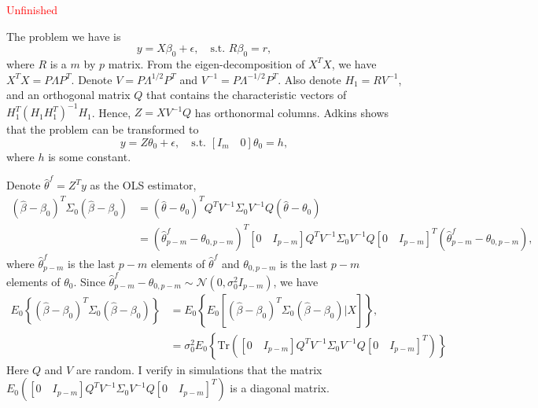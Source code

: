 \textcolor{red}{Unfinished}

The problem we have is 
\begin{equation}
y = X\beta_0 + \epsilon, \quad \text{s.t. } R\beta_0=r,
\end{equation}
where $R$ is a $m$ by $p$ matrix. From the eigen-decomposition of $X^T X$, we have $X^T X = P \Lambda P^T$. Denote $V = P \Lambda^{1/2} P^T$ and $V^{-1} = P \Lambda^{-1/2} P^T$. Also denote $H_1 = R V^{-1}$, and an orthogonal matrix $Q$ that contains the characteristic vectors of $H_1 ^T (H_1 H_1^T)^{-1} H_1$. Hence, $Z = XV^{-1}Q$ has orthonormal columns. Adkins shows that the problem can be transformed to
\begin{equation}
y = Z\theta_0 + \epsilon, \quad \text{s.t. } [I_m \quad 0]\theta_0=h,
\end{equation}
where $h$ is some constant. 

Denote $\hat{\theta}^f = Z^T y$ as the OLS estimator, 
\begin{equation}
\begin{aligned}
( \hat{\beta} - \beta_0 )^T \Sigma_0 ( \hat{\beta} - \beta_0 ) 
&= ( \hat{\theta} - \theta_0 )^T Q^T V^{-1} \Sigma_0 V^{-1} Q ( \hat{\theta} - \theta_0 ) \\
&= ( \hat{\theta}^f_{p-m} - \theta_{0,p-m} )^T [0 \quad I_{p-m}] Q^T V^{-1} \Sigma_0 V^{-1} Q [0 \quad I_{p-m}]^T ( \hat{\theta}^f_{p-m} - \theta_{0,p-m} ),
\end{aligned}
\end{equation}
where $\hat{\theta}^f_{p-m}$ is the last $p-m$ elements of $\hat{\theta}^f$ and $\theta_{0,p-m}$ is the last $p-m$ elements of $\theta_0$. Since $\hat{\theta}^f_{p-m} - \theta_{0,p-m} \sim \mathcal{N}(0, \sigma_0^2 I_{p-m})$, we have
\begin{equation}
\begin{aligned}
E_0 \left\{ ( \hat{\beta} - \beta_0 )^T \Sigma_0 ( \hat{\beta} - \beta_0 )  \right\} 
&= E_0 \left\{ E_0 \left[ ( \hat{\beta} - \beta_0 )^T \Sigma_0 ( \hat{\beta} - \beta_0 ) | X \right]  \right\},\\
&= \sigma_0^2 E_0\left\{ \text{Tr}\left( [0 \quad I_{p-m}] Q^T V^{-1} \Sigma_0 V^{-1} Q [0 \quad I_{p-m}]^T \right) \right\}
\end{aligned}
\end{equation}
Here $Q$ and $V$ are random. I verify in simulations that the matrix $E_0 ([0 \quad I_{p-m}] Q^T V^{-1} \Sigma_0 V^{-1} Q [0 \quad I_{p-m}]^T)$ is a diagonal matrix.

\fi

